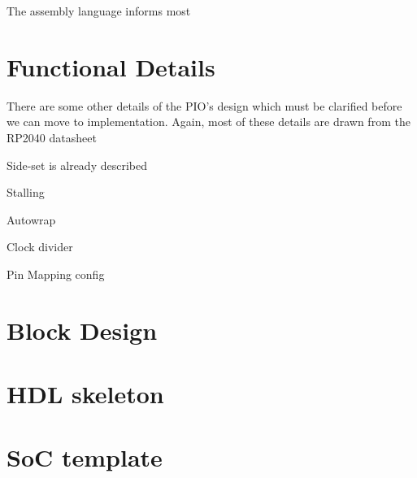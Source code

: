 The assembly language informs most



\section{Functional Details}
There are some other details of the PIO's design which must be clarified before we can move to implementation. Again, most of these details are drawn from the RP2040 datasheet

Side-set is already described

Stalling

Autowrap

Clock divider

Pin Mapping config

\section{Block Design}



\section{HDL skeleton}

\section{SoC template}